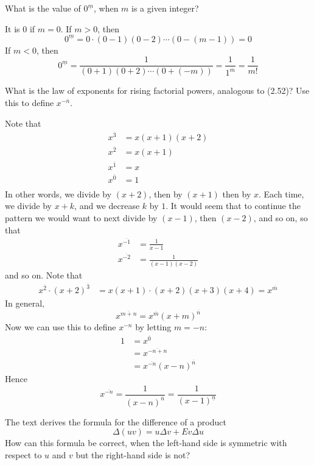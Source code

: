 \documentclass[12pt]{article}
\newenvironment{ex}[2][Exercise]{\begin{trivlist}
		\item[\hskip \labelsep {\bfseries #1}\hskip \labelsep {\bfseries #2.}]}{\end{trivlist}}
\newenvironment{sol}[1][Solution]{\begin{trivlist}
		\item[\hskip \labelsep {\bfseries #1:}]}{\end{trivlist}}
\begin{document}
\begin{ex}{8}
	What is the value of $0^{\underline{m}}$, when $m$ is a given integer?
\end{ex}

\begin{sol}
	It is 0 if $m=0$. If $m>0$, then
	\[
	0^{\underline{m}}=0\cdot (0-1)(0-2)\cdots(0-(m-1))=0
	\]
	If $m<0$, then
	\[
	0^{\underline{m}}=\frac{1}{(0+1)(0+2)\cdots (0+(-m))}=\frac{1}{1^{\overline{m}}}=\frac{1}{m!}
	\]
\end{sol}

\begin{ex}{9}
	What is the law of exponents for rising factorial powers, analogous to (2.52)?
	Use this to define $x^{-\overline{n}}$.
\end{ex}

\begin{sol}
	Note that
	\begin{align*}
		x^{\overline{3}}&=x(x+1)(x+2)\\
		x^{\overline{2}}&=x(x+1)\\
		x^{\overline{1}}&=x\\
		x^{\overline{0}}&=1\\
	\end{align*}
	In other words, we divide by $(x+2)$, then by $(x+1)$ then by $x$. Each time, we divide by
	$x+k$, and we decrease $k$ by $1$. It would seem that to continue the pattern we would want
	to next divide by $(x-1)$, then $(x-2)$, and so on, so that
	\begin{align*}
		x^{\overline{-1}}&=\frac{1}{x-1}\\
		x^{\overline{-2}}&=\frac{1}{(x-1)(x-2)}
	\end{align*}
	and so on. Note that
	\begin{align*}
		x^{\overline{2}}\cdot (x+2)^{\overline{3}}&=x(x+1)\cdot (x+2)(x+3)(x+4)=x^{\overline{m}}
	\end{align*}
	In general,
	\[
	x^{\overline{m+n}}=x^{\overline{m}}(x+m)^{\overline{n}}
	\]
	Now we can use this to define $x^{-n}$ by letting $m=-n$:
	\begin{align*}
		1&=x^{\overline{0}}\\
		&=x^{\overline{-n+n}}\\
		&=x^{\overline{-n}}(x-n)^{\overline{n}}
	\end{align*}
	Hence
	\[
	x^{\overline{-n}}=\frac{1}{(x-n)^{\overline{n}}}=\frac{1}{(x-1)^{\underline{n}}}
	\]
\end{sol}

\begin{ex}{10}
	The text derives the formula for the difference of a product
	\[
	\Delta (uv)=u\Delta v + Ev\Delta u
	\]
	How can this formula be correct, when the left-hand side is symmetric with respect to $u$
	and $v$ but the right-hand side is not? 
\end{ex}
\end{document}
